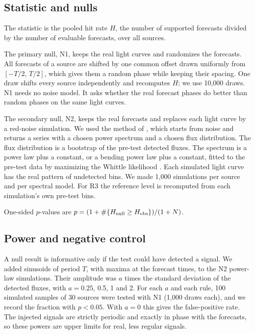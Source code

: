 \documentclass[twocolumn]{aastex631}
\newcommand{\Hit}{H}
\begin{document}
\subsection{Statistic and nulls} \label{sec:nulls}

The statistic is the pooled hit rate $\Hit$, the number of supported forecasts divided by the number of evaluable forecasts, over all sources.

The primary null, N1, keeps the real light curves and randomizes the forecasts. All forecasts of a source are shifted by one common offset drawn uniformly from $[-T/2,\,T/2]$, which gives them a random phase while keeping their spacing. One draw shifts every source independently and recomputes $\Hit$; we use 10,000 draws. N1 needs no noise model. It asks whether the real forecast phases do better than random phases on the same light curves.

The secondary null, N2, keeps the real forecasts and replaces each light curve by a red-noise simulation. We used the method of \citet{emmanoulopoulos13}, which starts from \citet{timmer95} noise and returns a series with a chosen power spectrum and a chosen flux distribution. The flux distribution is a bootstrap of the pre-test detected fluxes. The spectrum is a power law plus a constant, or a bending power law plus a constant, fitted to the pre-test data by maximizing the Whittle likelihood \citep{vaughan10}. Each simulated light curve has the real pattern of undetected bins. We made 1,000 simulations per source and per spectral model. For R3 the reference level is recomputed from each simulation's own pre-test bins.

One-sided $p$-values are $p = (1+\#\{\Hit_{\rm null}\ge \Hit_{\rm obs}\})/(1+N)$.

\subsection{Power and negative control} \label{sec:checks}

A null result is informative only if the test could have detected a signal. We added sinusoids of period $T$, with maxima at the forecast times, to the N2 power-law simulations. Their amplitude was $a$ times the standard deviation of the detected fluxes, with $a = 0.25$, 0.5, 1 and 2. For each $a$ and each rule, 100 simulated samples of 30 sources were tested with N1 (1,000 draws each), and we record the fraction with $p<0.05$. With $a=0$ this gives the false-positive rate. The injected signals are strictly periodic and exactly in phase with the forecasts, so these powers are upper limits for real, less regular signals.
\end{document}
